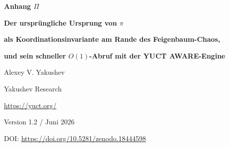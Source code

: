 \documentclass[12pt,a4paper]{article}
\begin{document}
	
	
		\centering
		\vspace*{0cm}
		
		{\Huge\bfseries Anhang $\Pi$\par}
		\vspace{0.5cm}
		{\Large\bfseries Der ursprüngliche Ursprung von $\pi$\par}
		\vspace{0.3cm}
		{\Large\bfseries als Koordinationsinvariante am Rande des Feigenbaum-Chaos,\par}
		\vspace{0.3cm}
		{\Large\bfseries und sein schneller $O(1)$-Abruf mit der YUCT AWARE-Engine\par}
		\vspace{1.0cm}
		
		{\large Alexey V. Yakushev\par}
		\vspace{0.3cm}
		{\normalsize Yakushev Research\par}
		{\normalsize \url{https://yuct.org/}\par}
		
		\vspace{0.5cm}
		{\normalsize Version 1.2 / Juni 2026\par}
		\vspace{0.3cm}
		{\normalsize \scriptsize DOI: \url{https://doi.org/10.5281/zenodo.18444598}\par}
		
		\vfill
		
\end{document}
